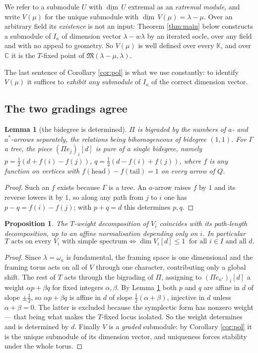 \documentclass[reqno]{amsart}
\theoremstyle{plain}
\newtheorem{proposition}[theorem]{Proposition}
\newtheorem{lemma}[theorem]{Lemma}
\theoremstyle{definition}
\newcommand{\dimv}{\underline{\dim}\,}
\newcommand{\la}{\lambda}
\newcommand{\om}{\omega}
\newcommand{\ka}{\kappa}
\newcommand{\Pia}{\Pi}
\begin{document}
We refer to a submodule $U$ with $\dimv U$ extremal as an \emph{extremal
module}, and write $V(\mu)$ for the unique submodule with
$\dimv V(\mu)=\la-\mu$.  Over an arbitrary field its \emph{existence} is not an
input: Theorem \ref{thm:main} below constructs a submodule of $I_\ka$ of
dimension vector $\la-w\la$ by an iterated socle, over any field and with no
appeal to geometry.  So $V(\mu)$ is well defined over every $\mathbb{K}$, and
over $\mathbb{C}$ it is the $T$-fixed point of $\mathfrak{M}(\la-\mu,\la)$.

The last sentence of Corollary \ref{cor:pol} is what we use constantly: to
identify $V(\mu)$ it suffices to \emph{exhibit any submodule} of $I_\ka$ of the
correct dimension vector.

\subsection{The two gradings agree}
\begin{lemma}[the bidegree is determined]\label{lem:bigrade}
$\Pia$ is bigraded by the numbers of $a$- and $a^*$-arrows separately, the
relations being bihomogeneous of bidegree $(1,1)$.  For $\Gamma$ a tree, the
piece $(\Pia e_j)_i[d]$ is pure of a single bidegree, namely
$p=\frac12(d+f(i)-f(j))$, $q=\frac12(d-f(i)+f(j))$, where $f$ is any function
on vertices with $f(\mathrm{head})-f(\mathrm{tail})=1$ on every arrow of $Q$.
\end{lemma}

\begin{proof}
Such an $f$ exists because $\Gamma$ is a tree.  An $a$-arrow raises $f$ by $1$
and its reverse lowers it by $1$, so along any path from $j$ to $i$ one has
$p-q=f(i)-f(j)$; with $p+q=d$ this determines $p,q$.
\end{proof}

\begin{proposition}\label{prop:grading}
The $T$-weight decomposition of $V_i$ coincides with its path-length
decomposition, up to an affine normalisation depending only on $i$.  In
particular
\[
   T \text{ acts on every } V_i \text{ with simple spectrum}
   \iff
   \dim V_i[d]\le 1 \ \text{ for all } i\in I \text{ and all } d .
\]
\end{proposition}

\begin{proof}
Since $\la=\om_\ka$ is fundamental, the framing space is one dimensional and
the framing torus acts on all of $V$ through one character, contributing only a
global shift.  The rest of $T$ acts through the bigrading of $\Pia$, assigning
to $(\Pia e_{\ka'})_i[d]$ a weight $\alpha p+\beta q$ for fixed integers
$\alpha,\beta$.  By Lemma \ref{lem:bigrade} both $p$ and $q$ are affine in $d$
of slope $\pm\frac12$, so $\alpha p+\beta q$ is affine in $d$ of slope
$\frac12(\alpha+\beta)$, injective in $d$ unless $\alpha+\beta=0$.  The latter
is excluded because the symplectic form has nonzero weight --- that being what
makes the $T$-fixed locus isolated.  So the weight determines and is determined
by $d$.  Finally $V$ is a \emph{graded} submodule: by Corollary \ref{cor:pol}
it is the unique submodule of its dimension vector, and uniqueness forces
stability under the whole torus.
\end{proof}
\end{document}
